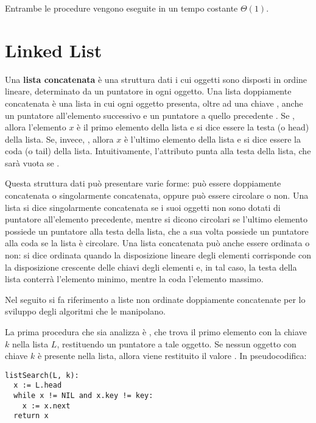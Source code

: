 Entrambe le procedure vengono eseguite in un tempo costante \(\Theta(1)\).

\section{Linked List}
Una \textbf{lista concatenata} è una struttura dati i cui oggetti sono disposti in ordine lineare, determinato da un puntatore in ogni oggetto. Una lista doppiamente concatenata è una lista in cui ogni oggetto presenta, oltre ad una chiave , anche un puntatore all'elemento successivo  e un puntatore a quello precedente . Se , allora l'elemento \(x\) è il primo elemento della lista e si dice essere la testa (o head) della lista. Se, invece, , allora \(x\) è l'ultimo elemento della lista e si dice essere la coda (o tail) della lista. Intuitivamente, l'attributo  punta alla testa della lista, che sarà vuota se .

Questa struttura dati può presentare varie forme: può essere doppiamente concatenata o singolarmente concatenata, oppure può essere circolare o non. Una lista si dice singolarmente concatenata se i suoi oggetti non sono dotati di puntatore all'elemento precedente, mentre si dicono circolari se l'ultimo elemento possiede un puntatore alla testa della lista, che a sua volta possiede un puntatore alla coda se la lista è circolare. Una lista concatenata può anche essere ordinata o non: si dice ordinata quando la disposizione lineare degli elementi corrisponde con la disposizione crescente delle chiavi degli elementi e, in tal caso, la testa della lista conterrà l'elemento minimo, mentre la coda l'elemento massimo. 

Nel seguito si fa riferimento a liste non ordinate doppiamente concatenate per lo sviluppo degli algoritmi che le manipolano. 

\vspace{10pt}

La prima procedura che sia analizza è , che trova il primo elemento con la chiave \(k\) nella lista \(L\), restituendo un puntatore a tale oggetto. Se nessun oggetto con chiave \(k\) è presente nella lista, allora viene restituito il valore . In pseudocodifica:

\begin{lstlisting}
listSearch(L, k):
  x := L.head
  while x != NIL and x.key != key:
    x := x.next
  return x  
\end{lstlisting}


